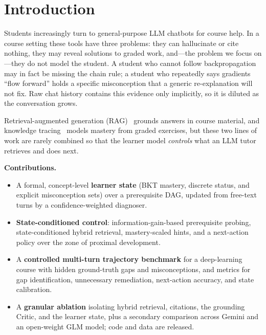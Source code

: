 \section{Introduction}
Students increasingly turn to general-purpose LLM chatbots for course help. In a course setting these tools have three problems: they can hallucinate or cite nothing, they may reveal solutions to graded work, and---the problem we focus on---they do not model the student. A student who cannot follow backpropagation may in fact be missing the chain rule; a student who repeatedly says gradients ``flow forward'' holds a specific misconception that a generic re-explanation will not fix. Raw chat history contains this evidence only implicitly, so it is diluted as the conversation grows.

Retrieval-augmented generation (RAG)~\cite{lewis2020rag} grounds answers in course material, and knowledge tracing~\cite{corbett1994bkt,piech2015dkt} models mastery from graded exercises, but these two lines of work are rarely combined so that the learner model \emph{controls} what an LLM tutor retrieves and does next.


\noindent\textbf{Contributions.}
\begin{itemize}
\item A formal, concept-level \textbf{learner state} (BKT mastery, discrete status, and explicit misconception sets) over a prerequisite DAG, updated from free-text turns by a confidence-weighted diagnoser.
\item \textbf{State-conditioned control}: information-gain-based prerequisite probing, state-conditioned hybrid retrieval, mastery-scaled hints, and a next-action policy over the zone of proximal development.
\item A \textbf{controlled multi-turn trajectory benchmark} for a deep-learning course with hidden ground-truth gaps and misconceptions, and metrics for gap identification, unnecessary remediation, next-action accuracy, and state calibration.
\item A \textbf{granular ablation} isolating hybrid retrieval, citations, the grounding Critic, and the learner state, plus a secondary comparison across Gemini and an open-weight GLM model; code and data are released.
\end{itemize}
